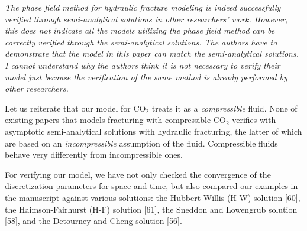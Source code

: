 \documentclass{elsarticle}
\newcommand{\review}[1]{ \textit{#1}}
\begin{document}
\clearpage

    \review{
    	The phase field method for hydraulic fracture modeling is indeed successfully verified through semi-analytical solutions in other researchers' work. However, this does not indicate all the models utilizing the phase field method can be correctly verified through the semi-analytical solutions. The authors have to demonstrate that the model in this paper can match the semi-analytical solutions. I cannot understand why the authors think it is not necessary to verify their model just because the verification of the same method is already performed by other researchers.}  	
  	
  	
	\bigskip

Let us reiterate that our model for CO$_2$ treats it as a \emph{compressible} fluid. None of existing papers that models fracturing with compressible CO$_2$ verifies with asymptotic semi-analytical solutions with hydraulic fracturing, the latter of which are based on an \emph{incompressible} assumption of the fluid. Compressible fluids behave very differently from incompressible ones.

For verifying our model, we have not only checked the convergence of the discretization parameters for space and time, but also compared our examples in the manuscript against various solutions: the Hubbert-Willis (H-W) solution [60], the Haimson-Fairhurst (H-F) solution [61], the Sneddon and Lowengrub solution [58], and the Detourney and Cheng solution [56].
\end{document}
